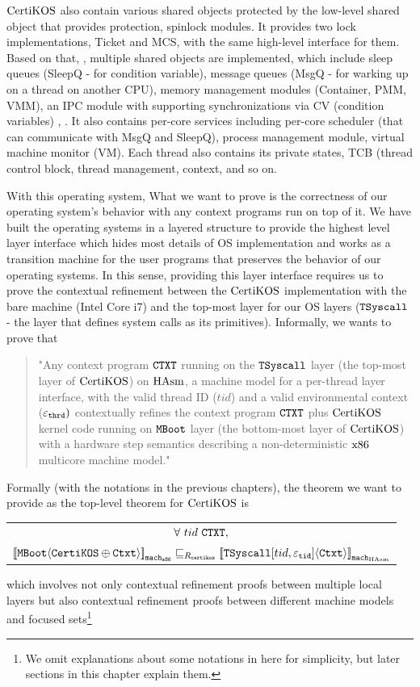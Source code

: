 $\mathrm{CertiKOS}$ also contain various shared objects protected by 
the low-level shared object that provides protection, spinlock modules.
It provides two lock implementations, Ticket and MCS, with the same high-level interface for them. 
Based on that, , 
multiple shared objects are implemented, which include
sleep queues (SleepQ - for condition variable), message queues (MsgQ - for warking up on a thread on another CPU), memory management modules (Container, PMM, VMM), an IPC module with supporting synchronizations via CV (condition variables) , \etc.  
It also contains per-core services including per-core scheduler (that can communicate with MsgQ and SleepQ), process management module,
virtual machine monitor (VM). 
Each thread also contains its private states, TCB (thread control block, thread management, context, and so on. 

With this operating system, 
What we want to prove is the correctness of our operating system's behavior with any context programs run on top of it.
We have built the operating systems in a layered structure to provide the highest level layer interface which hides most details of OS implementation and
works as a transition machine for the user programs that preserves the behavior of our operating systems.  
In this sense, providing this layer interface requires us 
to prove the contextual refinement between the $\mathrm{CertiKOS}$ implementation with the bare machine (Intel Core i7) and 
the top-most layer for our OS layers (${\mathrm{\texttt{TSyscall}}}$ - the layer that defines system calls as its primitives).
Informally, we wants to prove that
\begin{quote}
"Any context program ${\mathrm{\texttt{CTXT}}}$ running on the ${\mathrm{\texttt{TSyscall}}}$ layer (the top-most layer of $\mathrm{CertiKOS}$) on $\mathrm{HAsm}$, a machine model for a per-thread layer interface, with the valid thread ID ($tid$)
and a valid environmental context (${\varepsilon}_{{\mathrm{\texttt{thrd}}}})$ 
contextually refines the context program ${\mathrm{\texttt{CTXT}}}$ plus $\mathrm{CertiKOS}$ kernel code running on ${\mathrm{\texttt{MBoot}}}$ layer (the bottom-most layer of $\mathrm{CertiKOS}$) with a hardware step semantics describing a non-deterministic $\mathrm{x86}$ multicore machine model."
\end{quote}
Formally (with the notations in the previous chapters), the theorem we want to provide as the top-level theorem for $\mathrm{CertiKOS}$ is 
 \begin{center}
\begin{tabular}{c}
$\forall\ tid\  \codeinmath{CTXT},$\\
${[\![{{\mathrm{\texttt{MBoot}}}} \langle {{\mathrm{\texttt{CertiKOS}}} \oplus {\mathrm{\texttt{Ctxt}}}} \rangle]\!]}_{{\mathrm{\texttt{mach}}}_{{\mathrm{\texttt{x86}}}}} \sqsubseteq_{R_{{\mathrm{\texttt{certikos}}}}} {[\![{{\mathrm{\texttt{TSyscall}}}[tid, {\varepsilon}_{{\mathrm{\texttt{tid}}}}]} \langle {{\mathrm{\texttt{Ctxt}}}} \rangle]\!]}_{{{\mathrm{\texttt{mach}}}_{\mathrm{HAsm}}}}$\\
\end{tabular}
\end{center}
which involves not only contextual refinement proofs between multiple local layers but also contextual refinement proofs between
different machine models and focused sets\footnote{We omit explanations about some notations in here for simplicity, but later sections in this chapter explain them.}

